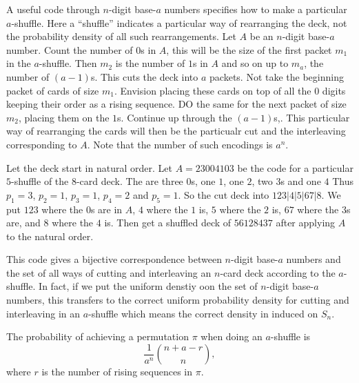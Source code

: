 \documentclass[12pt]{article}
\begin{document}
A useful code through \( n \)-digit base-\( a \) numbers specifies how
to make a particular \( a \)-shuffle.  Here a ``shuffle'' indicates a
particular way of rearranging the deck, not the probability density of
all such rearrangements.  Let \( A \) be an \( n \)-digit base-\( a \)
number. Count the number of \( 0 \)s in \( A \), this will be the size
of the first packet \( m_1 \) in the \( a \)-shuffle.  Then \( m_2 \) is
the number of \( 1 \)s in \( A \) and so on up to \( m_a \), the number
of \( (a-1) \)s.  This cuts the deck into \( a \) packets.  Not take the
beginning packet of cards of size \( m_1 \).  Envision placing these
cards on top of all the \( 0 \) digits keeping their order as a rising
sequence.  DO the same for the next packet of size \( m_2 \), placing
them on the \( 1 \)s.  Continue up through the \( (a-1) \)s,.  This
particular way of rearranging the cards will then be the particualr cut
and the interleaving corresponding to \( A \).  Note that the number of
such encodings is \( a^n \).

\begin{example}
    Let the deck start in natural order.  Let \( A = 23004103 \) be the
    code for a particular \( 5 \)-shuffle of the \( 8 \)-card deck.  The
    are three \( 0 \)s, one \( 1 \), one \( 2 \), two \( 3 \)s and one \(
    4 \) Thus \( p_1 = 3 \), \( p_2 = 1 \), \( p_3 =1 \), \( p_4 = 2 \)
    and \( p_5 = 1 \).  So the cut deck into \( 123|4|5|67|8 \).  We put
    \( 123 \) where the \( 0 \)s are in \( A \), \( 4 \) where the \( 1 \)
    is, \( 5 \) where the \( 2 \) is, \( 67 \) where the \( 3 \)s are,
    and \( 8 \) where the \( 4 \) is.  Then get a shuffled deck of \(
    56128437 \) after applying \( A \) to the natural order.
\end{example}

This code gives a bijective correspondence between \( n \)-digit base-\(
a \) numbers and the set of all ways of cutting and interleaving an \( n
\)-card deck according to the \( a \)-shuffle.  In fact, if we put the
uniform denstiy oon the set of \( n \)-digit base-\( a \) numbers, this
transfers to the correct uniform probability density for cutting and
interleaving in an \( a \)-shuffle which means the correct density in
induced on \( S_n \).

\begin{theorem}
    The probability of achieving a permutation \( \pi \) when doing an \(
    a \)-shuffle is
    \[
        \frac{1}{a^n} \binom{n + a - r}{n},
    \] where \( r \) is the number of rising sequences in \( \pi \).
\end{theorem}
\end{document}
